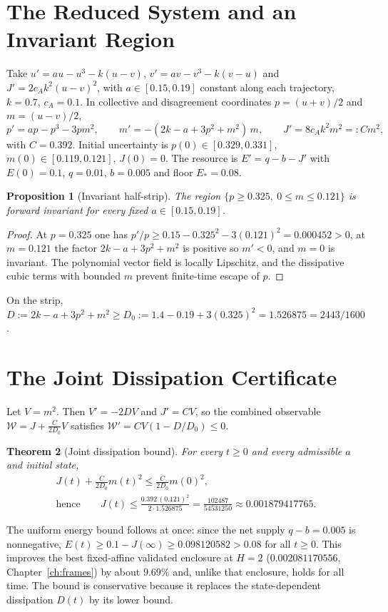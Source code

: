 \documentclass[11pt,notitlepage]{report}
\newtheorem{theorem}{Theorem}[chapter]
\newtheorem{proposition}[theorem]{Proposition}
\theoremstyle{definition}
\theoremstyle{remark}
\begin{document}
\section{The Reduced System and an Invariant Region}
Take $u'=au-u^3-k(u-v)$, $v'=av-v^3-k(v-u)$ and $J'=2c_Ak^2(u-v)^2$, with $a\in[0.15,0.19]$ constant along each trajectory, $k=0.7$, $c_A=0.1$. In collective and disagreement coordinates $p=(u+v)/2$ and $m=(u-v)/2$,
\begin{equation}\label{eq:pm}
p'=ap-p^3-3pm^2,\qquad m'=-(2k-a+3p^2+m^2)\,m,\qquad J'=8c_Ak^2m^2=:Cm^2,
\end{equation}
with $C=0.392$. Initial uncertainty is $p(0)\in[0.329,0.331]$, $m(0)\in[0.119,0.121]$, $J(0)=0$. The resource is $E'=q-b-J'$ with $E(0)=0.1$, $q=0.01$, $b=0.005$ and floor $E_*=0.08$.

\begin{proposition}[Invariant half-strip]\label{prop:strip}
The region $\{p\ge0.325,\ 0\le m\le0.121\}$ is forward invariant for every fixed $a\in[0.15,0.19]$.
\end{proposition}
\begin{proof}
At $p=0.325$ one has $p'/p\ge0.15-0.325^2-3(0.121)^2=0.000452>0$, at $m=0.121$ the factor $2k-a+3p^2+m^2$ is positive so $m'<0$, and $m=0$ is invariant. The polynomial vector field is locally Lipschitz, and the dissipative cubic terms with bounded $m$ prevent finite-time escape of $p$.
\end{proof}
On the strip, $D:=2k-a+3p^2+m^2\ge D_0:=1.4-0.19+3(0.325)^2=1.526875=2443/1600$.

\section{The Joint Dissipation Certificate}
Let $V=m^2$. Then $V'=-2DV$ and $J'=CV$, so the combined observable $\mathcal W=J+\tfrac{C}{2D_0}V$ satisfies $\mathcal W'=CV(1-D/D_0)\le0$.
\begin{theorem}[Joint dissipation bound]\label{th:joint}
For every $t\ge0$ and every admissible $a$ and initial state,
\begin{gather*}
J(t)+\tfrac{C}{2D_0}m(t)^2\le\tfrac{C}{2D_0}m(0)^2,\\
\text{hence}\qquad J(t)\le\frac{0.392\,(0.121)^2}{2\cdot1.526875}=\frac{102487}{54531250}\approx0.001879417765.
\end{gather*}
\end{theorem}
The uniform energy bound follows at once: since the net supply $q-b=0.005$ is nonnegative, $E(t)\ge0.1-J(\infty)\ge0.098120582>0.08$ for all $t\ge0$. This improves the best fixed-affine validated enclosure at $H=2$ ($0.002081170556$, Chapter~\ref{ch:frames}) by about $9.69\%$ and, unlike that enclosure, holds for all time. The bound is conservative because it replaces the state-dependent dissipation $D(t)$ by its lower bound.
\end{document}
